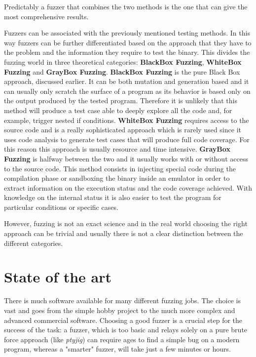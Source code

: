 \documentclass[../main.tex]{subfiles}
\begin{document}
Predictably a fuzzer that combines the two methods is the one that can give the most comprehensive results.

Fuzzers can be associated with the previously mentioned testing methods. In this way fuzzers can be further differentiated based on the approach that they have to the problem and the information they require to test the binary. This divides the fuzzing world in three theoretical categories: \textbf{BlackBox Fuzzing}, \textbf{WhiteBox Fuzzing} and \textbf{GrayBox Fuzzing}. \textbf{BlackBox Fuzzing} is the pure Black Box approach, discussed earlier. It can be both mutation and generation based and it can usually only scratch the surface of a program as its behavior is based only on the output produced by the tested program. Therefore it is unlikely that this method will produce a test case able to deeply explore all the code and, for example, trigger nested if conditions. \textbf{WhiteBox Fuzzing} requires access to the source code and is a really sophisticated approach which is rarely used since it uses code analysis to generate test cases that will produce full code coverage. For this reason this approach is usually resource and time intensive. \textbf{GrayBox Fuzzing} is halfway between the two and it usually works with or without access to the source code. This method consists in injecting special code during the compilation phase or sandboxing the binary inside an emulator in order to extract information on the execution status and the code coverage achieved. With knowledge on the internal status it is also easier to test the program for particular conditions or specific cases.

However, fuzzing is not an exact science and in the real world choosing the right approach can be trivial and usually there is not a clear distinction between the different categories.


\section{State of the art}

There is much software available for many different fuzzing jobs. The choice is vast and goes from the simple hobby project to the much more complex and advanced commercial software. Choosing a good fuzzer is a crucial step for the success of the task: a fuzzer, which is too basic and relays solely on a pure brute force approach (like \textit{ptyjig}) can require ages to find a simple bug on a modern program, whereas a "smarter" fuzzer, will take just a few minutes or hours.
\end{document}
